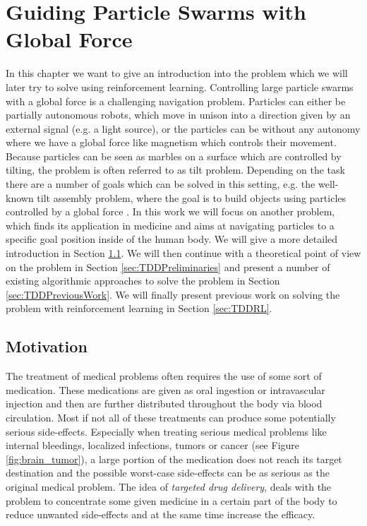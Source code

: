 \chapter{Guiding Particle Swarms with Global Force} \label{chp:TDD}
In this chapter we want to give an introduction into the problem which we will later try to solve using reinforcement learning. Controlling large particle swarms with a global force is a challenging navigation problem. Particles can either be partially autonomous robots, which move in unison into a direction given by an external signal (e.g. a light source), or the particles can be without any autonomy where we have a global force like magnetism which controls their movement. Because particles can be seen as marbles on a surface which are controlled by tilting, the problem is often referred to as tilt problem. Depending on the task there are a number of goals which can be solved in this setting, e.g. the well-known tilt assembly problem, where the goal is to build objects using particles controlled by a global force \cite{becker2018tilt}. In this work we will focus on another problem, which finds its application in medicine and aims at navigating particles to a specific goal position inside of the human body. We will give a more detailed introduction in Section \ref{sec:TDDMotivation}. We will then continue with a theoretical point of view on the problem in Section \ref{sec:TDDPreliminaries} and present a number of existing algorithmic approaches to solve the problem in Section \ref{sec:TDDPreviousWork}. We will finally present previous work on solving the problem with reinforcement learning in Section \ref{sec:TDDRL}. 

\section{Motivation} \label{sec:TDDMotivation}
The treatment of medical problems often requires the use of some sort of medication. These medications are given as oral ingestion or intravascular  injection and then are further distributed throughout the body via blood circulation. Most if not all of these treatments can produce some potentially serious side-effects. Especially when treating serious medical problems like internal bleedings, localized infections, tumors or cancer (see Figure \ref{fig:brain_tumor}), a large portion of the medication does not reach its target destination and the possible worst-case side-effects can be as serious as the original medical problem. The idea of \textit{targeted drug delivery}, deals with the problem to concentrate some given medicine in a certain part of the body to reduce unwanted side-effects and at the same time increase the efficacy.


